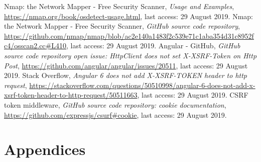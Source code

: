 \documentclass{article} %
\begin{document}
\begin{thebibliography}{9}
Nmap: the Network Mapper - Free Security Scanner, \emph{Usage and Examples}, \url{https://nmap.org/book/osdetect-usage.html}, last access: 29 August 2019.
Nmap: the Network Mapper - Free Security Scanner, \emph{GitHub source code repository}, \url{https://github.com/nmap/nmap/blob/ac2e140a1483f2c539e71c1aba354d31c8952fc4/osscan2.cc#L410}, last access: 29 August 2019.
Angular - GitHub, \emph{GitHub source code repository open issue: HttpClient does not set X-XSRF-Token on Http Post}, \url{https://github.com/angular/angular/issues/20511}, last access: 29 August 2019.
Stack Overflow, \emph{Angular 6 does not add X-XSRF-TOKEN header to http request}, \url{https://stackoverflow.com/questions/50510998/angular-6-does-not-add-x-xsrf-token-header-to-http-request/50511663}, last access: 29 August 2019.
CSRF token middleware, \emph{GitHub source code repository: cookie documentation}, \url{https://github.com/expressjs/csurf#cookie}, last access: 29 August 2019. 
\end{thebibliography}
\newpage
\appendix
{}
\section*{Appendices}
\end{document}
